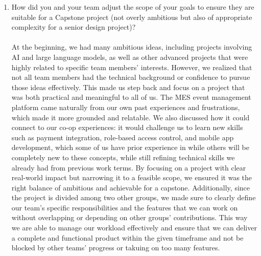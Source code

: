 \documentclass{article}
\begin{document}
\begin{enumerate}
    \item How did you and your team adjust the scope of your goals to ensure
    they are suitable for a Capstone project (not overly ambitious but also of
    appropriate complexity for a senior design project)?
    \\
    \\At the beginning, we had many ambitious ideas, including projects involving AI and large language models, as well as other advanced
     projects that were highly related to specific team members' interests. However, we realized
     that not all team members had the technical background or confidence to pursue those ideas effectively. This made us step back
     and focus on a project that was both practical and meaningful to all of us. The MES event management platform came naturally from
     our own past experiences and frustrations, which made it more grounded and relatable. We also discussed how it could connect to
     our co-op experiences: it would challenge us to learn new skills such as payment integration, role-based access control, and
     mobile app development, which some of us have prior experience in while others will be completely new to these concepts,
     while still refining technical skills we already had from previous work terms. By focusing on a project
     with clear real-world impact but narrowing it to a feasible scope, we ensured it was the right balance of ambitious and achievable
     for a capstone. Additionally, since the project is divided among two other groups, we made sure to clearly define our team's specific
      responsibilities and the features that we can work on without overlapping or depending on other groups' contributions. This way we are
      able to manage our workload effectively and ensure that we can deliver a complete and functional product within the given timeframe and
      not be blocked by other teams' progress or takuing on too many features.
\end{enumerate}  
\end{document}
